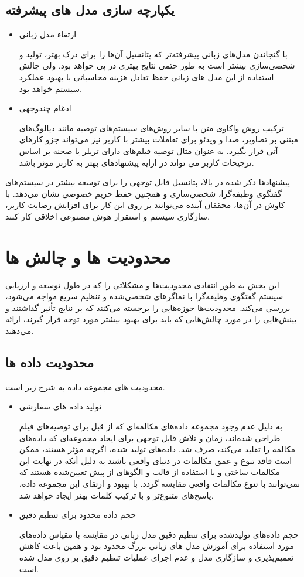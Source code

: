 \subsection{یکپارچه سازی مدل های پیشرفته}
\begin{itemize}
\item
ارتقاء مدل زبانی

با گنجاندن مدل‌های زبانی پیشرفته‌تر که پتانسیل آن‌ها را برای درک بهتر، تولید و شخصی‌سازی بیشتر است به طور حتمی نتایج بهتری در پی خواهد بود. ولی چالش استفاده از این مدل های زبانی حفظ تعادل هزینه محاسباتی با بهبود عملکرد سیستم خواهد بود.
\item
ادغام چندوجهی

ترکیب روش واکاوی متن با سایر روش‌های سیستم‌های توصیه مانند دیالوگ‌های مبتنی بر تصاویر، صدا و ویدئو برای تعاملات بیشتر با کاربر نیز می‌تواند جزو کارهای آتی قرار بگیرد. به عنوان مثال توصیه فیلم‌های دارای تریلر یا صحنه بر اساس ترجیحات کاربر می تواند در ارایه پیشنهادهای بهتر به کاربر موثر باشد.
\end{itemize}

پیشنهادها ذکر شده در بالا، پتانسیل قابل توجهی را برای توسعه بیشتر در سیستم‌های گفتگوی وظیفه‌گرا، شخصی‌سازی و همچنین حفظ حریم خصوصی نشان می‌دهد. با کاوش در آن‌ها، محققان آینده می‌توانند بر روی این کار برای افزایش رضایت کاربر، سازگاری سیستم و استقرار هوش مصنوعی اخلاقی کار کنند.


\section{محدودیت ها و چالش ها}

این بخش به طور انتقادی محدودیت‌ها و مشکلاتی را که در طول توسعه و ارزیابی سیستم گفتگوی وظیفه‌گرا با نماگر‌های شخصی‌شده و تنظیم سریع مواجه می‌شود، بررسی می‌کند. محدودیت‌ها حوزه‌هایی را برجسته می‌کنند که بر نتایج تأثیر گذاشتند و بینش‌هایی را در مورد چالش‌هایی که باید برای بهبود بیشتر مورد توجه قرار گیرند، ارائه می‌دهند.

\subsection{محدودیت داده ها}
محدودیت های مجموعه داده به شرح زیر است.
\begin{itemize}
\item
 تولید داده های سفارشی

به دلیل عدم وجود مجموعه داده‌های مکالمه‌ای که از قبل برای توصیه‌های فیلم طراحی شده‌اند، زمان و تلاش قابل توجهی برای ایجاد مجموعه‌ای که داده‌های مکالمه را تقلید می‌کند، صرف شد. داده‌های تولید شده، اگرچه مؤثر هستند، ممکن است فاقد تنوع و عمق مکالمات در دنیای واقعی باشند به دلیل آنکه در نهایت این مکالمات ساختی و با استفاده از قالب و الگوهای از پیش تعیین‌شده هستند که نمی‌توانند با تنوع مکالمات واقعی مقایسه گردد. با بهبود و ارتقای این مجموعه داده، پاسخ‌های متنوع‌تر و با ترکیب کلمات بهتر ایجاد خواهد شد.

\item
 حجم داده محدود برای تنظیم دقیق

حجم داده‌های تولیدشده برای تنظیم دقیق مدل زبانی در مقایسه با مقیاس داده‌های مورد استفاده برای آموزش مدل های زبانی بزرگ محدود بود و همین باعث کاهش تعمیم‌پذیری و سازگاری مدل و عدم اجرای عملیات تنظیم دقیق بر روی مدل شده است.
\end{itemize}

